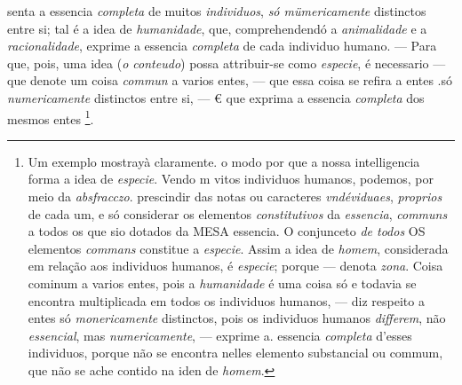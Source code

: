senta a essencia \emph{completa} de muitos \emph{individuos}, \emph{só mümericamente} distinctos entre si; tal é a idea de \emph{humanidade}, que, comprehendendó a \emph{animalidade} e a \emph{racionalidade}, exprime a essencia \emph{completa} de cada individuo humano. --- Para que, pois, uma idea (\emph{o conteudo}) possa attribuir-se como \emph{especie}, é necessario --- que denote um coisa \emph{commun} a varios entes, --- que essa coisa se refira a entes .só \emph{numericamente} distinctos entre si, --- € que exprima a essencia \emph{completa} dos mesmos entes \footnote{Um exemplo mostrayà claramente. o modo por que a nossa intelligencia forma a idea de \emph{especie}. Vendo m vitos individuos humanos, podemos, por meio da \emph{absfracczo}. prescindir das notas ou caracteres \emph{vndéviduaes}, \emph{proprios} de cada um, e só considerar os elementos \emph{constitutivos} da \emph{essencia}, \emph{communs} a todos os que sio dotados da MESA essencia. O conjunceto \emph{de todos} OS elementos \emph{commans} constitue a \emph{especie}. Assim a idea de \emph{homem}, considerada em relação aos individuos humanos, é \emph{especie}; porque --- denota \emph{zona}. Coisa cominum a varios entes, pois a \emph{humanidade} é uma coisa só e todavia se encontra multiplicada em todos os individuos humanos, --- diz respeito a entes só \emph{monericamente} distinctos, pois os individuos humanos \emph{differem}, não \emph{essencial}, mas \emph{numericamente}, --- exprime a. essencia \emph{completa} d'esses individuos, porque não se encontra nelles elemento substancial ou commum, que não se ache contido na iden de \emph{homem}.}.


